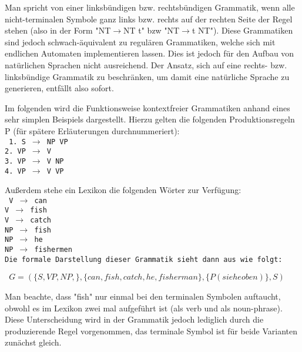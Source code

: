 \documentclass[12pt]{paper}
\begin{document}
Man spricht von einer linksbündigen bzw. rechtsbündigen Grammatik, wenn alle nicht-terminalen Symbole ganz links bzw. rechts auf der rechten Seite der Regel stehen (also in der Form "NT$\rightarrow$NT t" bzw "NT$\rightarrow$t NT"). Diese Grammatiken sind jedoch schwach-äquivalent zu regulären Grammatiken, welche sich mit endlichen Automaten implementieren lassen. Dies ist jedoch für den Aufbau von natürlichen Sprachen nicht ausreichend. Der Ansatz, sich auf eine rechts- bzw. linksbündige Grammatik zu beschränken, um damit eine natürliche Sprache zu generieren, entfällt also sofort. 

Im folgenden wird die Funktionsweise kontextfreier Grammatiken anhand eines sehr simplen Beispiels dargestellt. Hierzu gelten die folgenden Produktionsregeln P (für spätere Erläuterungen durchnummeriert):
\newline
\\
\tt
1. S $\rightarrow$ NP VP\\
2. VP $\rightarrow$ V\\
3. VP $\rightarrow$ V NP\\
4. VP $\rightarrow$ V VP\\

\rm

Außerdem stehe ein Lexikon die folgenden Wörter zur Verfügung:
\newline
\\
\tt
V $\rightarrow$ can\\
V $\rightarrow$ fish\\
V $\rightarrow$ catch\\
NP $\rightarrow$ fish\\
NP $\rightarrow$ he\\
NP $\rightarrow$ fishermen\\
\rm 
\newline
Die formale Darstellung dieser Grammatik sieht dann aus wie folgt:

\begin{center}
\tt
$G=(\lbrace S,VP,NP,\rbrace ,\lbrace can, fish, catch, he, fisherman\rbrace ,\lbrace P(siehe oben)\rbrace ,S)$
\rm
\end{center}

Man beachte, dass "fish" nur einmal bei den terminalen Symbolen auftaucht, obwohl es im Lexikon zwei mal aufgeführt ist (als verb und als noun-phrase). Diese Unterscheidung wird in der Grammatik jedoch lediglich durch die produzierende Regel vorgenommen, das terminale Symbol ist für beide Varianten zunächst gleich.
\end{document}
